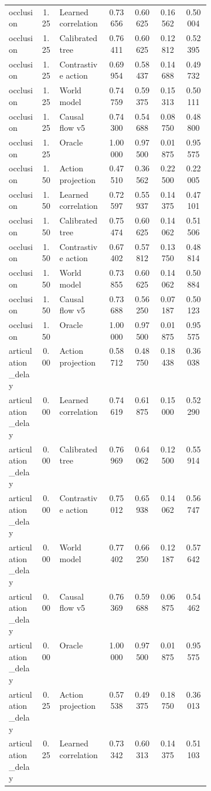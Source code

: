 \documentclass{article}
\begin{document}
\begin{center}
\begin{longtable}{p{0.16\linewidth}cp{0.24\linewidth}cccc}
occlusion & 1.25 & Learned correlation & 0.73656 & 0.60625 & 0.16562 & 0.50004\\
occlusion & 1.25 & Calibrated tree & 0.76411 & 0.60625 & 0.12812 & 0.52395\\
occlusion & 1.25 & Contrastive action & 0.69954 & 0.58437 & 0.14688 & 0.49732\\
occlusion & 1.25 & World model & 0.74759 & 0.59375 & 0.15313 & 0.50111\\
occlusion & 1.25 & Causal flow v5 & 0.74300 & 0.54688 & 0.08750 & 0.48800\\
occlusion & 1.25 & Oracle & 1.00000 & 0.97500 & 0.01875 & 0.95575\\
occlusion & 1.50 & Action projection & 0.47510 & 0.36562 & 0.22500 & 0.22005\\
occlusion & 1.50 & Learned correlation & 0.72597 & 0.55937 & 0.14375 & 0.47101\\
occlusion & 1.50 & Calibrated tree & 0.75474 & 0.60625 & 0.14062 & 0.51506\\
occlusion & 1.50 & Contrastive action & 0.67402 & 0.57812 & 0.13750 & 0.48814\\
occlusion & 1.50 & World model & 0.73855 & 0.60625 & 0.14062 & 0.50884\\
occlusion & 1.50 & Causal flow v5 & 0.73688 & 0.56250 & 0.07187 & 0.50123\\
occlusion & 1.50 & Oracle & 1.00000 & 0.97500 & 0.01875 & 0.95575\\
articulation\_delay & 0.00 & Action projection & 0.58712 & 0.48750 & 0.18438 & 0.36038\\
articulation\_delay & 0.00 & Learned correlation & 0.74619 & 0.61875 & 0.15000 & 0.52290\\
articulation\_delay & 0.00 & Calibrated tree & 0.76969 & 0.64062 & 0.12500 & 0.55914\\
articulation\_delay & 0.00 & Contrastive action & 0.75012 & 0.65938 & 0.14062 & 0.56747\\
articulation\_delay & 0.00 & World model & 0.77402 & 0.66250 & 0.12187 & 0.57642\\
articulation\_delay & 0.00 & Causal flow v5 & 0.76369 & 0.59688 & 0.06875 & 0.54462\\
articulation\_delay & 0.00 & Oracle & 1.00000 & 0.97500 & 0.01875 & 0.95575\\
articulation\_delay & 0.25 & Action projection & 0.57538 & 0.49375 & 0.18750 & 0.36013\\
articulation\_delay & 0.25 & Learned correlation & 0.73342 & 0.60313 & 0.14375 & 0.51103\\

\end{longtable}
\end{center}
\end{document}

